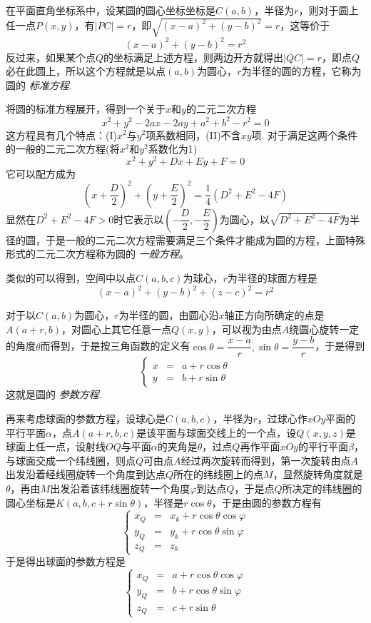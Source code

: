 在平面直角坐标系中，设某圆的圆心坐标坐标是$C(a,b)$，半径为$r$，则对于圆上任一点$P(x,y)$，有$|PC|=r$，即$\sqrt{(x-a)^2+(y-b)^2}=r$，这等价于
\[ (x-a)^2+(y-b)^2=r^2 \]
反过来，如果某个点$Q$的坐标满足上述方程，则两边开方就得出$|QC|=r$，即点$Q$必在此圆上，所以这个方程就是以点$(a,b)$为圆心，$r$为半径的圆的方程，它称为圆的 \emph{标准方程}.

将圆的标准方程展开，得到一个关于$x$和$y$的二元二次方程
\[ x^2+y^2-2ax-2ay+a^2+b^2-r^2=0 \]
这方程具有几个特点：(I)$x^2$与$y^2$项系数相同，(II)不含$xy$项. 对于满足这两个条件的一般的二元二次方程(将$x^2$和$y^2$系数化为1)
\[ x^2+y^2+Dx+Ey+F=0 \]
它可以配方成为
\[ \left( x+\frac{D}{2} \right)^2 + \left( y+\frac{E}{2} \right)^2 = \frac{1}{4}(D^2+E^2-4F) \]
显然在$D^2+E^2-4F>0$时它表示以$\left( -\dfrac{D}{2}, -\dfrac{E}{2} \right)$为圆心，以$\sqrt{D^2+E^2-4F}$为半径的圆，于是一般的二元二次方程需要满足三个条件才能成为圆的方程，上面特殊形式的二元二次方程称为圆的 \emph{一般方程}。

类似的可以得到，空间中以点$C(a,b,c)$为球心，$r$为半径的球面方程是
\[ (x-a)^2+(y-b)^2+(z-c)^2=r^2 \]

对于以$C(a,b)$为圆心，$r$为半径的圆，由圆心沿$x$轴正方向所确定的点是$A(a+r,b)$，对圆心上其它任意一点$Q(x,y)$，可以视为由点$A$绕圆心旋转一定的角度$\theta$而得到，于是按三角函数的定义有$\cos{\theta}=\dfrac{x-a}{r},\sin{\theta}=\dfrac{y-b}{r}$，于是得到
\[ \left\{
    \begin{array}{lll}
      x & = & a + r \cos{\theta} \\
      y & = & b + r \sin{\theta} 
    \end{array}
  \right. \]
这就是圆的 \emph{参数方程}.

再来考虑球面的参数方程，设球心是$C(a,b,c)$，半径为$r$，过球心作$xOy$平面的平行平面$\alpha$，点$A(a+r,b,c)$是该平面与球面交线上的一个点，设$Q(x,y,z)$是球面上任一点，设射线$OQ$与平面$\alpha$的夹角是$\theta$，过点$Q$再作平面$xOy$的平行平面$\beta$，与球面交成一个纬线圈，则点$Q$可由点$A$经过两次旋转而得到，第一次旋转由点$A$出发沿着经线圈旋转一个角度到达点$Q$所在的纬线圈上的点$M$，显然旋转角度就是$\theta$，再由$M$出发沿着该纬线圈旋转一个角度$\varphi$到达点$Q$，于是点$Q$所决定的纬线圈的圆心坐标是$K(a,b,c+r\sin{\theta})$，半径是$r\cos{\theta}$，于是由圆的参数方程有
\[ \left\{
    \begin{array}{lll}
      x_Q & = & x_k + r \cos{\theta}\cos{\varphi}  \\
      y_Q & = & y_k + r \cos{\theta}\sin{\varphi} \\
      z_Q & = & z_k
    \end{array}
  \right. \]
于是得出球面的参数方程是
\[ \left\{
    \begin{array}{lll}
      x_Q & = & a + r \cos{\theta}\cos{\varphi}  \\
      y_Q & = & b + r \cos{\theta}\sin{\varphi} \\
      z_Q & = & c+r\sin{\theta}
    \end{array}
  \right. \]



